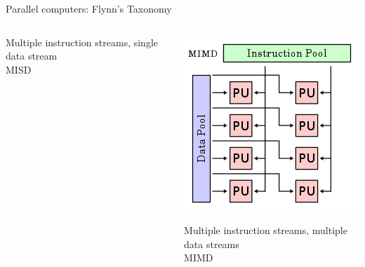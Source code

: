 \documentclass[xcolor={svgnames,usenames}]{beamer}
\begin{document}
\begin{frame}{Parallel computers: Flynn's Taxonomy}
\begin{itemize}
\begin{columns}
\begin{column}{0.25\columnwidth}
	Multiple instruction streams, single data stream\\MISD
\end{column}
\begin{column}{0.25\columnwidth}
					\centering
			\small
	\includegraphics[width=\columnwidth]{MIMD.png}			
	
	\alert<6->{Multiple instruction streams, multiple data streams\\MIMD}
\end{column}
	\end{columns}
\end{itemize}
\end{frame}
\end{document}
